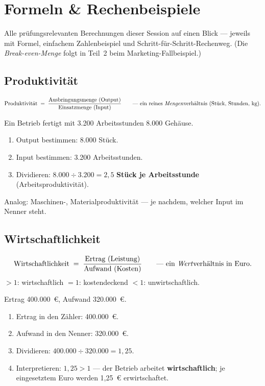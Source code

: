 \documentclass[11pt, a4paper]{article}
\begin{document}
\section{Formeln \& Rechenbeispiele}

Alle prüfungsrelevanten Berechnungen dieser Session auf einen Blick --- jeweils mit
Formel, einfachem Zahlenbeispiel und Schritt-für-Schritt-Rechenweg. (Die
\emph{Break-even-Menge} folgt in Teil~2 beim Marketing-Fallbeispiel.)

\subsection{Produktivität}

\begin{merksatz}[title={\bfseries Formel: Produktivität}]
\[
\text{Produktivität} \;=\; \frac{\text{Ausbringungsmenge (Output)}}{\text{Einsatzmenge (Input)}}
\qquad \text{--- ein reines \emph{Mengen}verhältnis (Stück, Stunden, kg).}
\]
\end{merksatz}

\begin{beispiel}
Ein Betrieb fertigt mit 3.200 Arbeitsstunden 8.000 Gehäuse.
\begin{enumerate}
  \item Output bestimmen: 8.000 Stück.
  \item Input bestimmen: 3.200 Arbeitsstunden.
  \item Dividieren: $8.000 \div 3.200 = 2{,}5$ \textbf{Stück je Arbeitsstunde}
    (Arbeitsproduktivität).
\end{enumerate}
Analog: Maschinen-, Materialproduktivität --- je nachdem, welcher Input im Nenner steht.
\end{beispiel}

\subsection{Wirtschaftlichkeit}

\begin{merksatz}[title={\bfseries Formel: Wirtschaftlichkeit}]
\[
\text{Wirtschaftlichkeit} \;=\; \frac{\text{Ertrag (Leistung)}}{\text{Aufwand (Kosten)}}
\qquad \text{--- ein \emph{Wert}verhältnis in Euro.}
\]
$> 1$: wirtschaftlich \quad $= 1$: kostendeckend \quad $< 1$: unwirtschaftlich.
\end{merksatz}

\begin{beispiel}
Ertrag 400.000~€, Aufwand 320.000~€.
\begin{enumerate}
  \item Ertrag in den Zähler: 400.000~€.
  \item Aufwand in den Nenner: 320.000~€.
  \item Dividieren: $400.000 \div 320.000 = 1{,}25$.
  \item Interpretieren: $1{,}25 > 1$ --- der Betrieb arbeitet \textbf{wirtschaftlich};
    je eingesetztem Euro werden 1,25~€ erwirtschaftet.
\end{enumerate}
\end{beispiel}
\end{document}
